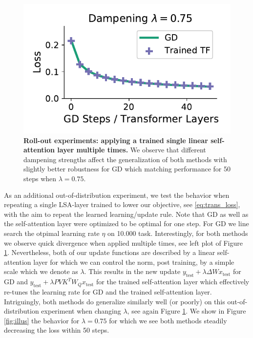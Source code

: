 \documentclass{article}
\theoremstyle{plain}
\theoremstyle{definition}
\theoremstyle{remark}
\begin{document}
\begin{figure}
\begin{center}
\begin{minipage}{.30\textwidth}
\begin{center}
  \end{center}
  \vspace{-10pt}
\end{minipage}
\begin{minipage}{.30\textwidth}
  \centering
  \begin{center}
    \includegraphics[width=1.\textwidth]{Final_figures/linear/rolling_out/train_15.pdf}
  \end{center}
  \vspace{-10pt}
\end{minipage}
\end{center}
\vspace{-3pt}
  \caption{\textbf{Roll-out experiments: applying a trained single linear self-attention layer multiple times.} We observe that different dampening strengths affect the generalization of both methods with slightly better robustness for GD which matching performance for 50 steps when $\lambda=0.75$.}
  \label{fig:rolling_out}
\end{figure}

As an additional out-of-distribution experiment, we test the behavior when repeating a single LSA-layer trained to lower our objective, see \eqref{eq:trans_loss}, with the aim to repeat the learned learning/update rule. Note that GD as well as the self-attention layer were optimized to be optimal for one step. For GD we line search the otpimal learning rate $\eta$ on 10.000 task.
Interestingly, for both methods we observe quick divergence when applied multiple times, see left plot of Figure \ref{fig:rolling_out}. Nevertheless, both of our update functions are described by a linear self-attention layer for which we can control the norm, post training, by a simple scale which we denote as $\lambda$. This results in the new update $y_{\text{test}} + \lambda \Delta Wx_{\text{test}}$ for GD and $y_{\text{test}} + \lambda PVK^TW_Qx_{\text{test}}$ for the trained self-attention layer which effectively re-tunes the learning rate for GD and the trained self-attention layer. Intriguingly, both methods do generalize similarly well (or poorly) on this out-of-distribution experiment when changing $\lambda$, see again Figure \ref{fig:rolling_out}. We show in Figure \ref{fig:illus} the behavior for $\lambda=0.75$ for which we see both methods steadily decreasing the loss within 50 steps. 
\end{document}
